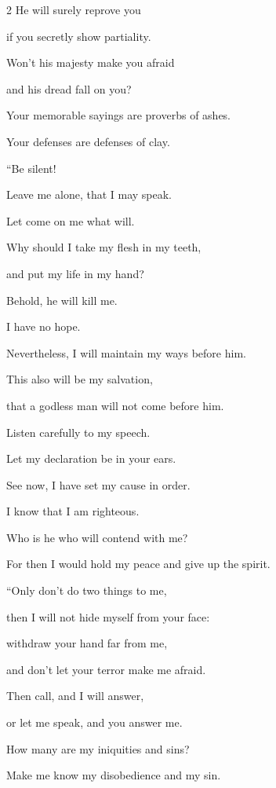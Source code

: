 \begin{multicols}{2}
	\myverse{}He will surely reprove you
	
	if you secretly show partiality.
	
	\myverse{}Won’t his majesty make you afraid
	
	and his dread fall on you?
	
	\myverse{}Your memorable sayings are proverbs of ashes.
	
	Your defenses are defenses of clay.
	
	\vspace{\baselineskip}
	
	
	\myverse{}“Be silent!
	
	Leave me alone, that I may speak.
	
	Let come on me what will.
	
	\myverse{}Why should I take my flesh in my teeth,
	
	and put my life in my hand?
	
	\myverse{}Behold, he will kill me.
	
	I have no hope.
	
	Nevertheless, I will maintain my ways before him.
	
	\myverse{}This also will be my salvation,
	
	that a godless man will not come before him.
	
	\myverse{}Listen carefully to my speech.
	
	Let my declaration be in your ears.
	
	\myverse{}See now, I have set my cause in order.
	
	I know that I am righteous.
	
	\myverse{}Who is he who will contend with me?
	
	For then I would hold my peace and give up the spirit.
	
	\vspace{\baselineskip}
	
	\myverse{}“Only don’t do two things to me,
	
	then I will not hide myself from your face:
	
	\myverse{}withdraw your hand far from me,
	
	and don’t let your terror make me afraid.
	
	\myverse{}Then call, and I will answer,
	
	or let me speak, and you answer me.
	
	\myverse{}How many are my iniquities and sins?
	
	Make me know my disobedience and my sin.
	

\end{multicols}
